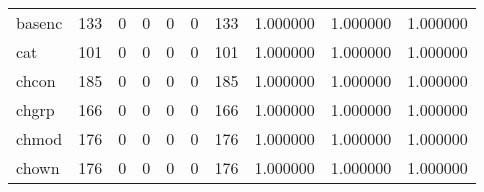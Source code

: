 \begin{tabular}{lrrrrrrrrr}
basenc    &                                   133 &                                                  0 &                                                  0 &                                                  0 &                                                  0 &                                                133 &                                           1.000000 &                               1.000000 &                             1.000000 \\
cat       &                                   101 &                                                  0 &                                                  0 &                                                  0 &                                                  0 &                                                101 &                                           1.000000 &                               1.000000 &                             1.000000 \\
chcon     &                                   185 &                                                  0 &                                                  0 &                                                  0 &                                                  0 &                                                185 &                                           1.000000 &                               1.000000 &                             1.000000 \\
chgrp     &                                   166 &                                                  0 &                                                  0 &                                                  0 &                                                  0 &                                                166 &                                           1.000000 &                               1.000000 &                             1.000000 \\
chmod     &                                   176 &                                                  0 &                                                  0 &                                                  0 &                                                  0 &                                                176 &                                           1.000000 &                               1.000000 &                             1.000000 \\
chown     &                                   176 &                                                  0 &                                                  0 &                                                  0 &                                                  0 &                                                176 &                                           1.000000 &                               1.000000 &                             1.000000 \\

\end{tabular}
